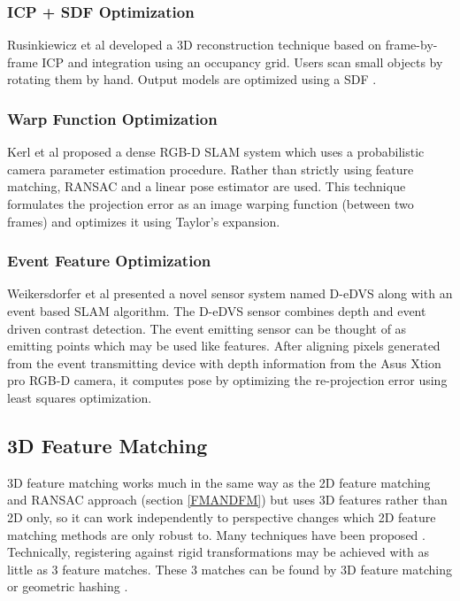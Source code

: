 \subsubsection{ICP + SDF Optimization}

Rusinkiewicz et al \cite{Rusinkiewicz02Real} developed a 3D reconstruction technique based on frame-by-frame ICP and integration using an occupancy grid. Users scan small objects by rotating them by hand. Output models are optimized using a SDF \cite{Curless96Volumetric}.


\subsubsection{Warp Function Optimization} 

Kerl et al \cite{Kerl13Dense} proposed a dense RGB-D SLAM system which uses a probabilistic camera parameter estimation procedure. Rather than strictly using feature matching, RANSAC and a linear pose estimator are used. This technique formulates the projection error as an image warping function (between two frames) and optimizes it using Taylor's expansion.

\subsubsection{Event Feature Optimization}

Weikersdorfer et al \cite{Weikersdorfer14Event} presented a novel sensor system named D-eDVS along with an event based SLAM algorithm. The D-eDVS sensor combines depth and event driven contrast detection. The event emitting sensor can be thought of as emitting points which may be used like features. After aligning pixels generated from the event transmitting device with depth information from the Asus Xtion pro RGB-D camera, it computes pose by optimizing the re-projection error using least squares optimization.


\subsection{3D Feature Matching}

3D feature matching works much in the same way as the 2D feature matching and RANSAC approach (section \ref{FMANDFM}) but uses 3D features rather than 2D only, so it can work independently to perspective changes which 2D feature matching methods are only robust to. Many techniques have been proposed \cite{Scovanner073Dimensional,Flitton10Object,Li05Multiscale}. Technically, registering against rigid transformations may be achieved with as little as 3 feature matches. These 3 matches can be found by 3D feature matching or geometric hashing \cite{Wolfson97Geometric}.



